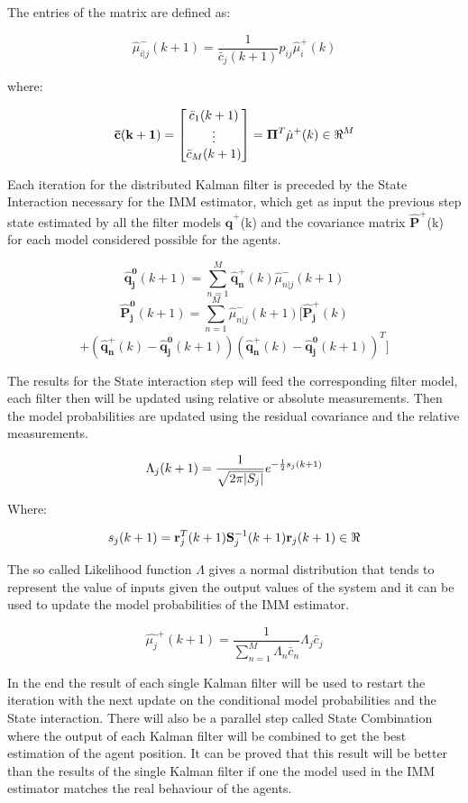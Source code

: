 \documentclass[conference]{IEEEtran}
\begin{document}
The entries of the matrix are defined as: 

$$   \hat{\mu}_{i|j}^{-}(k+1) = \frac{1}{\bar{c}_{j}(k+1)}p_{ij}\hat{\mu}_ {i}^{+}(k) $$

where: 


$$ \mathbf{\bar{c}(k+1)} =  \begin{bmatrix} \bar{c}_{1}(k+1) \\ \vdots \\  \bar{c}_{M}(k+1) \end{bmatrix}= \mathbf{\Pi}^{T}\hat{\mathbf{\mu}}^{+}(k)  \in \real^{M} $$


Each iteration for the distributed Kalman filter is preceded by the State Interaction necessary for the IMM estimator, which get as input the previous step state estimated by all the filter models $\mathbf{\hat{q}^{+}}$(k) and the covariance matrix $\mathbf{ \hat{P}^{+}}$(k) for each model considered possible for the agents. 


$$ \mathbf{\hat{q}_{j}^{0}}(k+1) = \sum_{n = 1}^{M} \mathbf{\hat{q}_{n}^{+}}(k)\hat{\mu}_{n|j}^{-}(k+1) $$
$$ \mathbf{\hat{P}_{j}^{0}}(k+1) = \sum_{n = 1}^{M} \hat{\mu}_{n|j}^{-}(k+1)[\mathbf{\hat{ P}_{j}^{+}}(k)$$
$$+( \mathbf{\hat{q}_{n}^{+}}(k) -  \mathbf{\hat{q}_{j}^{0}}(k+1))( \mathbf{\hat{q}_{n}^{+}}(k) -  \mathbf{\hat{q}_{j}^{0}}(k+1))^{T} ] $$

The results for the State interaction step will feed the corresponding filter model, each filter then will be updated using relative or absolute measurements. Then the model probabilities are updated using the residual covariance and the relative measurements.

$$ \Lambda_{j}(k+1) = \frac{1}{\sqrt{2\pi\abs{ S_{j}}}} e^{-\frac{1}{2}s_{j}(k+1)} $$ 

Where:

$$ s_{j}(k+1) = \mathbf{r}_{j}^{T}(k+1)\mathbf{S}_{j}^{-1}(k+1)\mathbf{r}_{j}(k+1) \in \real $$ 

The so called Likelihood function $ \Lambda$ gives a normal distribution that tends to represent the value of inputs given the output values of the system and it can be used to update the model probabilities of the IMM estimator.

$$ \hat{\mu_{j}}^{+}(k+1) = \frac{1}{\sum_{n=1}^{M}\Lambda_{n} \bar{c}_{n}}  \Lambda_{j} \bar{c}_{j}$$

In the end the result of each single Kalman filter will be used to restart the iteration with the next update on the conditional model probabilities and the State interaction. There will also be a parallel step called State Combination where the output of each Kalman filter will be combined to get the best estimation of the agent position. It can be proved that this result will be better than the results of the single Kalman filter if one the model used in the IMM estimator matches the real behaviour of the agents.
\end{document}
